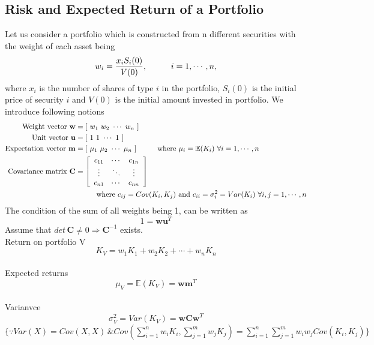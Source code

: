 \subsection{Risk and Expected Return of a Portfolio}
Let us consider a portfolio which is constructed from n different securities with the weight of each asset being $$w_{i}=\frac{x_{i}S_{i}(0)}{V(0)}, \hspace{10mm} i=1,\cdots,n,$$
where $x_{i}$ is the number of shares of type $i$ in the portfolio, $S_{i}(0)$ is the initial price of security $i$ and $V(0)$ is the initial amount invested in portfolio.
We introduce following notions \-
\begin{align*}
    \text{Weight vector } \mathbf{w}&=[\,\,w_{1}\,\,w_{2}\,\,\cdots\,\,w_{n}\,\,]\\
    \text{Unit vector } \mathbf{u}&=[\,\,1\,\,1\,\,\cdots\,\,1\,\,]\\
    \text{Expectation vector }    \mathbf{m}&=[\,\,\mu_{1}\,\,\mu_{2}\,\,\cdots\,\,\mu_{n}\,\,] \hspace{10mm} \text{where } \mu_{i}=\mathbb{E}(K_{i}) \,\, \forall i=1,\cdots,n\\
    \text{Covariance matrix } \mathbf{C}&=\left[
\begin{array}{ccc}
   c_{11} & \cdots & c_{1n} \\
   \vdots & \ddots & \vdots \\
   c_{n1} & \cdots & c_{nn} 
\end{array}
\right]\\ &\hspace{10mm} \text{where } c_{ij}=Cov(K_{i},K_{j}) \,\, \text{and } c_{ii}=\sigma_{i}^{2}=Var(K_{i}) \,\, \forall i,j=1,\cdots,n\\
\end{align*}
The condition of the sum of all weights being 1, can be written as \-
\begin{equation}
    1=\mathbf{wu}^{T}
\end{equation}
Assume that $det \, \mathbf{C} \neq 0 \Rightarrow \mathbf{C}^{-1}$ exists.
\\Return on portfolio V
\begin{equation}
    K_{V}=w_{1}K_{1}+w_{2}K_{2}+\cdots+w_{n}K_{n}
\end{equation}
\\Expected returns
\begin{equation}
    \mu_{V}=\mathbb{E}(K_{V})= \mathbf{wm}^{T}
\end{equation}
\\Varianvce
\begin{equation}
    \sigma_{V}^{2}=Var(K_{V})=\mathbf{wCw}^{T}
\end{equation}
$\{ \because Var(X)=Cov(X,X) \, \& Cov(\displaystyle \sum_{i=1}^{n} w_{i}K_{i}, \sum_{j=1}^{m} w_{j}K_{j}) = \sum_{i=1}^{n} \sum_{j=1}^{m} w_{i}w_{j}Cov(K_{i},K_{j})\}$


